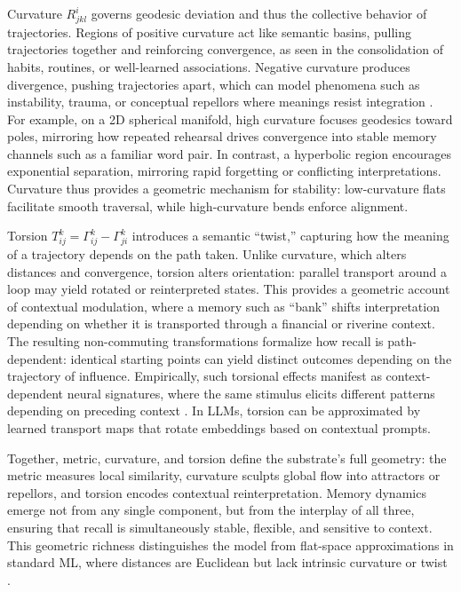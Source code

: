 \documentclass[a4paper,12pt]{article}
\begin{document}
Curvature $R^i_{jkl}$ governs geodesic deviation and thus the collective behavior of trajectories. Regions of positive curvature act like semantic basins, pulling trajectories together and reinforcing convergence, as seen in the consolidation of habits, routines, or well-learned associations. Negative curvature produces divergence, pushing trajectories apart, which can model phenomena such as instability, trauma, or conceptual repellors where meanings resist integration \citep{do_carmo1992riemannian}. For example, on a 2D spherical manifold, high curvature focuses geodesics toward poles, mirroring how repeated rehearsal drives convergence into stable memory channels such as a familiar word pair. In contrast, a hyperbolic region encourages exponential separation, mirroring rapid forgetting or conflicting interpretations. Curvature thus provides a geometric mechanism for stability: low-curvature flats facilitate smooth traversal, while high-curvature bends enforce alignment.

Torsion $T^k_{ij} = \Gamma^k_{ij} - \Gamma^k_{ji}$ introduces a semantic ``twist,'' capturing how the meaning of a trajectory depends on the path taken. Unlike curvature, which alters distances and convergence, torsion alters orientation: parallel transport around a loop may yield rotated or reinterpreted states. This provides a geometric account of contextual modulation, where a memory such as ``bank'' shifts interpretation depending on whether it is transported through a financial or riverine context. The resulting non-commuting transformations formalize how recall is path-dependent: identical starting points can yield distinct outcomes depending on the trajectory of influence. Empirically, such torsional effects manifest as context-dependent neural signatures, where the same stimulus elicits different patterns depending on preceding context \citep{hassabis2007patients}. In LLMs, torsion can be approximated by learned transport maps that rotate embeddings based on contextual prompts.

Together, metric, curvature, and torsion define the substrate’s full geometry: the metric measures local similarity, curvature sculpts global flow into attractors or repellors, and torsion encodes contextual reinterpretation. Memory dynamics emerge not from any single component, but from the interplay of all three, ensuring that recall is simultaneously stable, flexible, and sensitive to context. This geometric richness distinguishes the model from flat-space approximations in standard ML, where distances are Euclidean but lack intrinsic curvature or twist \citep{do_carmo1992riemannian}.
\end{document}
